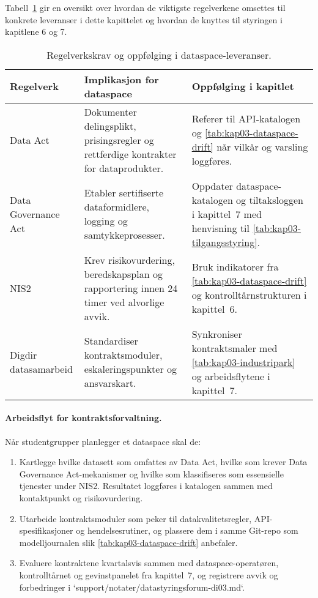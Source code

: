 Tabell~\ref{tab:kap03-regelverk} gir en oversikt over hvordan de viktigste regelverkene omsettes til konkrete leveranser i dette
kapittelet og hvordan de knyttes til styringen i kapitlene 6 og 7.

\begin{table}[ht]
    \centering
    \caption{Regelverkskrav og oppfølging i dataspace-leveranser.}
    \label{tab:kap03-regelverk}
    \begin{tabular}{p{}p{}p{}}
        \toprule
        \textbf{Regelverk} & \textbf{Implikasjon for dataspace} & \textbf{Oppfølging i kapitlet} \\
        \midrule
        Data Act & Dokumenter delingsplikt, prisingsregler og rettferdige kontrakter for dataprodukter. & Referer til API-katalogen og \autoref{tab:kap03-dataspace-drift} når vilkår og varsling loggføres. \\
        Data Governance Act & Etabler sertifiserte dataformidlere, logging og samtykkeprosesser. & Oppdater dataspace-katalogen og tiltaksloggen i kapittel~7 med henvisning til \autoref{tab:kap03-tilgangsstyring}. \\
        NIS2 & Krev risikovurdering, beredskapsplan og rapportering innen 24 timer ved alvorlige avvik. & Bruk indikatorer fra \autoref{tab:kap03-dataspace-drift} og kontrolltårnstrukturen i kapittel~6. \\
        Digdir datasamarbeid & Standardiser kontraktsmoduler, eskaleringspunkter og ansvarskart. & Synkroniser kontraktsmaler med \autoref{tab:kap03-industripark} og arbeidsflytene i kapittel~7. \\
        \bottomrule
    \end{tabular}
\end{table}

\paragraph{Arbeidsflyt for kontraktsforvaltning.} Når studentgrupper planlegger et dataspace skal de:
\begin{enumerate}
    \item Kartlegge hvilke datasett som omfattes av Data Act, hvilke som krever Data Governance Act-mekanismer og hvilke som klassifiseres
    som essensielle tjenester under NIS2. Resultatet loggføres i katalogen sammen med kontaktpunkt og risikovurdering.
    \item Utarbeide kontraktsmoduler som peker til datakvalitetsregler, API-spesifikasjoner og hendelsesrutiner, og plassere dem i samme
    Git-repo som modelljournalen slik \autoref{tab:kap03-dataspace-drift} anbefaler.
    \item Evaluere kontraktene kvartalsvis sammen med dataspace-operatøren, kontrolltårnet og gevinstpanelet fra kapittel~7, og registrere
    avvik og forbedringer i `support/notater/datastyringsforum-di03.md`.
\end{enumerate}

